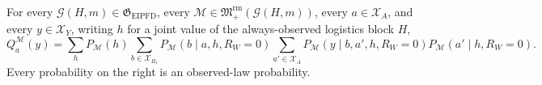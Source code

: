 For every \(\mathcal G(H,m)\in\mathfrak G_{\mathrm{EIPFD}}\), every \(\mathcal M\in\mathfrak M_{+}^{\mathrm{rm}}(\mathcal G(H,m))\), every \(a\in\mathcal X_A\), and every \(y\in\mathcal X_Y\), writing \(h\) for a joint value of the always-observed logistics block \(H\),
\[
Q_a^{\mathcal M}(y)=
\sum_hP_{\mathcal M}(h)
\sum_{b\in\mathcal X_{B_1}}P_{\mathcal M}(b\mid a,h,R_W=0)
\sum_{a'\in\mathcal X_A}P_{\mathcal M}(y\mid b,a',h,R_W=0)
P_{\mathcal M}(a'\mid h,R_W=0).
\]
Every probability on the right is an observed-law probability.